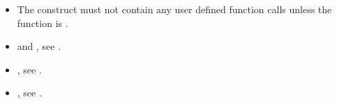 \begin{fortranspecific}
\begin{samepage}
\begin{itemize}
\item The construct must not contain any user defined function calls unless the function is
.
\end{itemize}
\end{samepage}

\crossreferences
\begin{itemize}
\item {} and , see
  .
\item {}, see .
\item {}, see
.
\end{itemize}

\end{fortranspecific}
